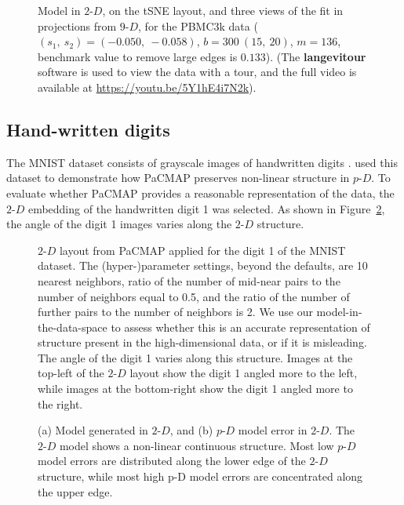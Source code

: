 \documentclass[
  12pt]{article}
\newcommand\pD{$p\text{-}D$}
\newcommand\gD{$2\text{-}D$}
\begin{document}
\begin{figure}[H]
\caption{\label{fig-pbmc2-sc}Model in \gD{}, on the tSNE layout, and
three views of the fit in projections from \(9\text{-}D\), for the
PBMC3k data (\((s_1, \ s_2) = (-0.050, \ -0.058)\),
\(b = 300 \  (15, \ 20)\), \(m = 136\), benchmark value to remove large
edges is \(0.133\)). (The \textbf{langevitour} software is used to view
the data with a tour, and the full video is available at
\url{https://youtu.be/5Y1hE4i7N2k}).}

\end{figure}%

\subsection{Hand-written digits}\label{hand-written-digits}

The MNIST dataset consists of grayscale images of handwritten digits
\citep{lecun2010}. \citet{yingfan2021} used this dataset to demonstrate
how PaCMAP preserves non-linear structure in \pD{}. To evaluate whether
PaCMAP provides a reasonable representation of the data, the \gD{}
embedding of the handwritten digit 1 was selected. As shown in
Figure~\ref{fig-pacmap-author}, the angle of the digit 1 images varies
along the \gD{} structure.

\begin{figure}[H]


\caption{\label{fig-pacmap-author}\(2\text{-}D\) layout from PaCMAP
applied for the digit 1 of the MNIST dataset. The (hyper-)parameter
settings, beyond the defaults, are 10 nearest neighbors, ratio of the
number of mid-near pairs to the number of neighbors equal to 0.5, and
the ratio of the number of further pairs to the number of neighbors is
2. We use our model-in-the-data-space to assess whether this is an
accurate representation of structure present in the high-dimensional
data, or if it is misleading. The angle of the digit 1 varies along this
structure. Images at the top-left of the \(2\text{-}D\) layout show the
digit 1 angled more to the left, while images at the bottom-right show
the digit 1 angled more to the right.}

\end{figure}%

\begin{figure}[H]


\caption{\label{fig-model-mnist}(a) Model generated in \(2\text{-}D\),
and (b) \(p\text{-}D\) model error in \(2\text{-}D\). The \(2\text{-}D\)
model shows a non-linear continuous structure. Most low \(p\text{-}D\)
model errors are distributed along the lower edge of the \(2\text{-}D\)
structure, while most high p-D model errors are concentrated along the
upper edge.}

\end{figure}%
\end{document}
